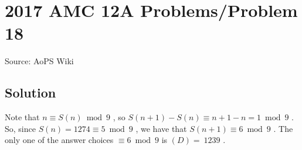 \documentclass[12pt]{article}
\begin{document}
\section*{{2017 AMC 12A Problems/Problem 18}}
Source: AoPS Wiki

\subsection*{Solution}
Note that $n\equiv S(n)\bmod 9$ , so $S(n+1)-S(n)\equiv n+1-n = 1\bmod 9$ . So, since $S(n)=1274\equiv 5\bmod 9$ , we have that $S(n+1)\equiv 6\bmod 9$ . The only one of the answer choices $\equiv 6\bmod 9$ is $\boxed{(D)=\ 1239}$ .
\end{document}
